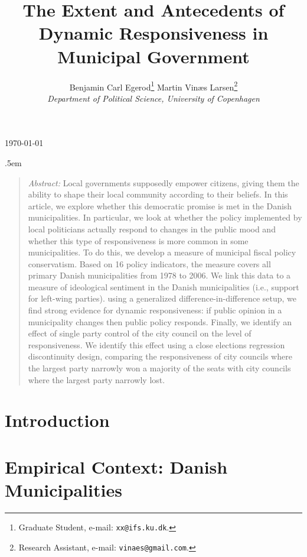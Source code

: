 \documentclass[a4paper,11pt]{article}
\title{\bigskip \bigskip \sffamily \LARGE The Extent and Antecedents of Dynamic Responsiveness in Municipal Government}
\author{\bigskip Benjamin Carl Egerod\footnote{Graduate Student, e-mail: \texttt{xx@ifs.ku.dk}.} \qquad Martin Vinæs Larsen\footnote{Research Assistant, e-mail: \texttt{vinaes@gmail.com}.} \\ \textit{Department of Political Science, University of Copenhagen}} %
\makeatletter
\renewcommand{\maketitle}{
	\begin{flushleft}
		
		\onehalfspacing
		
		\@title
		
		\lineskip .5em
		\normalfont{\normalsize{\@author}}
\end{flushleft}}
\makeatother
\begin{document}
	
	
	
	
	
	
	\begin{footnotesize} \noindent \today \end{footnotesize} %
	
	\vspace{0.7in}
	
	\maketitle
	
	\bigskip
	
	\begin{quotation} %
		\singlespace
		\small \noindent \emph{Abstract:} Local governments supposedly empower citizens, giving them the ability to shape their local community according to their beliefs. In this article, we explore whether this democratic promise is met in the Danish municipalities. In particular, we look at whether the policy implemented by local politicians actually respond to changes in the public mood and whether this type of responsiveness is more common in some municipalities. To do this, we develop a measure of municipal fiscal policy conservatism. Based on 16 policy indicators, the measure covers all primary Danish municipalities from 1978 to 2006. We link this data to a measure of ideological sentiment in the Danish municipalities (i.e., support for left-wing parties). using a generalized difference-in-difference setup, we find strong evidence for dynamic responsiveness: if public opinion in a municipality changes then public policy responds. Finally, we identify an effect of single party control of the city council on the level of responsiveness. We identify this effect using a close elections regression discontinuity design, comparing the responsiveness of city councils where the largest party narrowly won a majority of the seats with city councils where the largest party narrowly lost.
	\end{quotation}
	
	
	\thispagestyle{empty} %
	
	
\section{Introduction} %

\section{Empirical Context: Danish Municipalities}	
\end{document}
